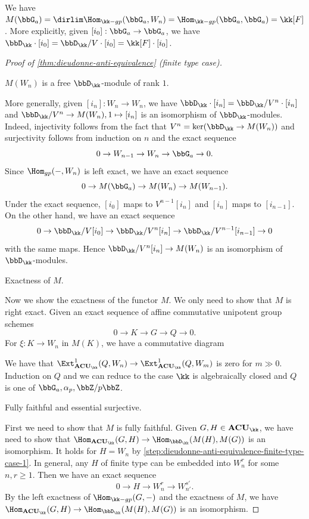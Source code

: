 \begin{example}
	We have $M(\bbG_a) = \dirlim \Hom_{\kk -gp}(\bbG_a, W_n) = \Hom_{\kk -gp}(\bbG_a, \bbG_a) = \kk[F]$.
	More explicitly, given $[i_0]: \bbG_a \to \bbG_a$, we have $\bbD_\kk \cdot [i_0] = \bbD_\kk / V \cdot [i_0] = \kk[F] \cdot [i_0]$.
\end{example}

\begin{proof}[Proof of \cref{thm:dieudonne-anti-equivalence} (finite type case)]
	\hspace{1em}
	\begin{step}\label{step:dieudonne-anti-equivalence-finite-type-case-1}
		$M(W_n)$ is a free $\bbD_\kk$-module of rank $1$.\Yang{}
	\end{step}
	More generally, given $[i_n]: W_n \to W_n$, we have $\bbD_\kk \cdot [i_n] = \bbD_\kk / V^{n} \cdot [i_n]$ and $\bbD_\kk / V^{n} \to M(W_n), 1 \mapsto [i_n]$ is an isomorphism of $\bbD_\kk$-modules.
	Indeed, injectivity follows from the fact that $V^n = \ker(\bbD_\kk \to M(W_n))$ and surjectivity follows from induction on $n$ and the exact sequence
	\[ 0 \to W_{n-1} \to W_n \to \bbG_a \to 0. \]
	Since $\Hom_{gp}(-, W_n)$ is left exact, we have an exact sequence
	\[ 0 \to M(\bbG_a) \to M(W_n) \to M(W_{n-1}). \]
	Under the exact sequence, $[i_0]$ maps to $V^{n-1} [i_n]$ and $[i_n]$ maps to $[i_{n-1}]$.
	On the other hand, we have an exact sequence
	\[ 0 \to \bbD_\kk / V [i_0] \to \bbD_\kk / V^n [i_n] \to \bbD_\kk / V^{n-1} [i_{n-1}] \to 0 \]
	with the same maps.
	Hence $\bbD_\kk / V^n [i_n] \to M(W_n)$ is an isomorphism of $\bbD_\kk$-modules.

	\begin{step}
		Exactness of $M$.
	\end{step}
	Now we show the exactness of the functor $M$.
	We only need to show that $M$ is right exact.
	Given an exact sequence of affine commutative unipotent group schemes
	\[ 0 \to K \to G \to Q \to 0. \]
	For $\xi: K \to W_n$ in $M(K)$, we have a commutative diagram
	\Yang{}

	We have that $\Ext^1_{\mathbf{ACU}_\kk}(Q, W_n) \to \Ext^1_{\mathbf{ACU}_\kk}(Q, W_{m})$ is zero for $m \gg 0$.
	Induction on $Q$ and we can reduce to the case $\kk$ is algebraically closed and $Q$ is one of $\bbG_a, \alpha_p, \bbZ/p\bbZ$.


	\begin{step}
		Fully faithful and essential surjective. \Yang{}
	\end{step}
	First we need to show that $M$ is fully faithful.
	Given $G, H \in \mathbf{ACU}_\kk$, we have need to show that $\Hom_{\mathbf{ACU}_\kk}(G, H) \to \Hom_{\bbD_\kk}(M(H), M(G))$ is an isomorphism.
	It holds for $H = W_n$ by \cref{step:dieudonne-anti-equivalence-finite-type-case-1}.
	In general, any $H$ of finite type can be embedded into $W_n^r$ for some $n, r \ge 1$.
	Then we have an exact sequence
	\[ 0 \to H \to W_n^r \to W_{n'}^{s'}. \]
	By the left exactness of $\Hom_{\kk-gp}(G, -)$ and the exactness of $M$, we have $\Hom_{\mathbf{ACU}_\kk}(G, H) \to \Hom_{\bbD_\kk}(M(H), M(G))$ is an isomorphism.

	\Yang{}
\end{proof}


